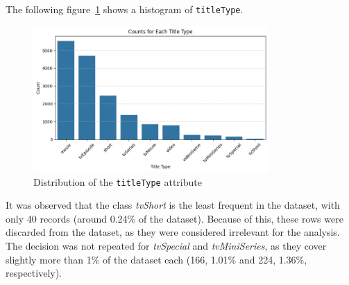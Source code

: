 The following figure~\ref{fig:titleType_distrib} shows a histogram of \texttt{titleType}.
\begin{figure}[H]
    \centering
    \includegraphics[width=0.8\textwidth]{plots/types_count.png}
    \caption{Distribution of the \texttt{titleType} attribute}
    \label{fig:titleType_distrib}
\end{figure}
It was observed that the class \textit{tvShort} is the least frequent in the dataset, with only 40 records (around 0.24\% of the dataset). Because of this, these rows were discarded from the dataset, as they were considered irrelevant for the analysis.\\

The decision was not repeated for \textit{tvSpecial} and \textit{tvMiniSeries}, as they cover slightly more than 1\% of the dataset each (166, 1.01\% and 224, 1.36\%, respectively).\\




